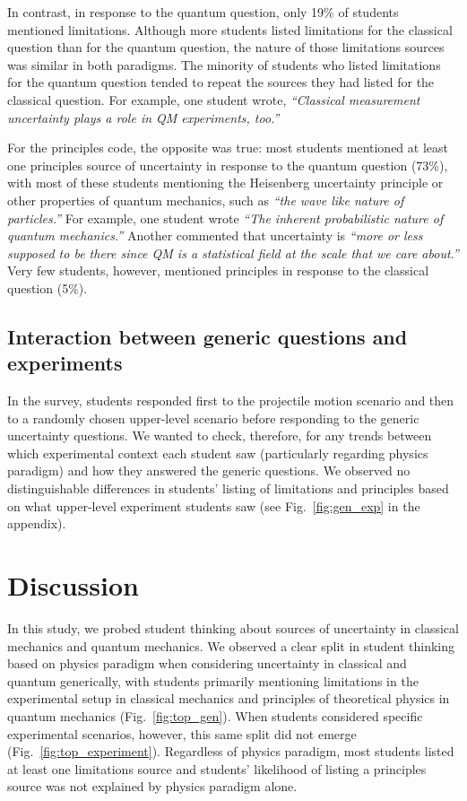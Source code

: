 \documentclass[english,aps,prstper,reprint,showpacs,longbibliography,superscriptaddress,nofootinbib]{revtex4-2}
\begin{document}
In contrast, in response to the quantum question, only 19\% of students mentioned limitations. Although more students listed limitations for the classical question than for the quantum question, the nature of those limitations sources was similar in both paradigms. The minority of students who listed limitations for the quantum question tended to repeat the sources they had listed for the classical question. For example, one student wrote, \textit{``Classical measurement uncertainty plays a role in QM experiments, too.''}

For the principles code, the opposite was true: most students mentioned at least one principles source of uncertainty in response to the quantum question (73\%), with most of these students mentioning the Heisenberg uncertainty principle or other properties of quantum mechanics, such as \textit{``the wave like nature of particles.''} For example, one student wrote \textit{``The inherent probabilistic nature of quantum mechanics.''} Another commented that uncertainty is \textit{``more or less supposed to be there since QM is a statistical field at the scale that we care about.''} Very few students, however, mentioned principles in response to the classical question (5\%).

\subsection{Interaction between generic questions and experiments}
\label{sec:priming}

In the survey, students responded first to the projectile motion scenario and then to a randomly chosen upper-level scenario before responding to the generic uncertainty questions. We wanted to check, therefore, for any trends between which experimental context each student saw (particularly regarding physics paradigm) and how they answered the generic questions. We observed no distinguishable differences in students' listing of limitations and principles based on what upper-level experiment students saw (see Fig.~\ref{fig:gen_exp} in the appendix).


\section{Discussion}

In this study, we probed student thinking about sources of uncertainty in classical mechanics and quantum mechanics. We observed a clear split in student thinking based on physics paradigm when considering uncertainty in classical and quantum generically, with students primarily mentioning limitations in the experimental setup in classical mechanics and principles of theoretical physics in quantum mechanics (Fig.~\ref{fig:top_gen}). When students considered specific experimental scenarios, however, this same split did not emerge (Fig.~\ref{fig:top_experiment}). Regardless of physics paradigm, most students listed at least one limitations source and students' likelihood of listing a principles source was not explained by physics paradigm alone.
\end{document}
